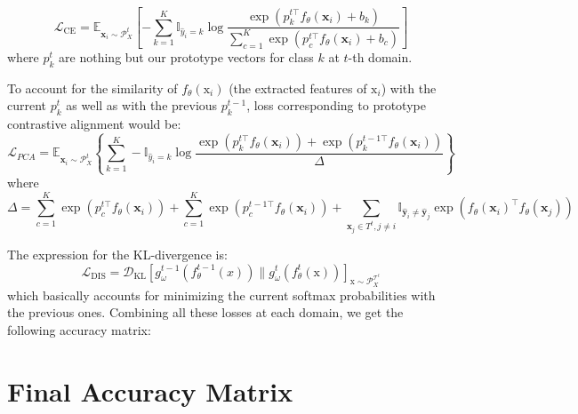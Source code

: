 \documentclass{article} %
\begin{document}
$$\mathcal{L}_{\text{CE}} = \mathbb{E}_{\textbf{x}_i \sim \mathcal{P}_X^t} \left[ - \sum_{k=1}^K \mathbb{I}_{\hat{y}_i = k} \log \frac{\exp \left( p_k^{t \top} f_\theta(\textbf{x}_i) + b_k \right)}{\sum_{c=1}^K \exp \left( p_c^{t \top} f_\theta(\textbf{x}_i) + b_c \right)} \right]$$
where $p_k^t$ are nothing but our prototype vectors for class $k$ at $t$-th domain. 

To account for the similarity of $f_\theta(\text{x}_i)$ (the extracted features of $\text{x}_i$) with the current $p_k^t$ as well as with the previous $p_k^{t - 1}$, loss corresponding to prototype contrastive alignment would be: 
\[\mathcal{L}_{PCA} = \mathbb{E}_{\textbf{x}_i \sim \mathcal{P}_X^t} \left\{\sum_{k=1}^K -\mathbb{I}_{\hat{y}_i = k} \log \frac{\exp \left( p_k^{t \top} f_\theta(\textbf{x}_i) \right) + \exp \left( p_k^{t-1 \top} f_\theta(\textbf{x}_i) \right)}{\Delta}\right \}
\]
where 
$$ \Delta = \sum_{c=1}^K \exp \left( p_c^{t \top} f_\theta(\textbf{x}_i) \right) + \sum_{c=1}^K \exp \left( p_c^{t-1 \top} f_\theta(\textbf{x}_i) \right) +\sum_{\textbf{x}_j \in T^t, j \neq i} \mathbb{I}_{\hat{\textbf{y}}_i \neq \hat{\textbf{y}}_j} \exp \left( f_\theta(\textbf{x}_i)^{\top} f_\theta(\textbf{x}_j) \right) $$

The expression for the KL-divergence is: 
$$\mathcal{L}_{\text{DIS}} = \mathcal{D}_{\text{KL}} [g_\omega^{t-1} (f_\theta^{t-1} (x)) \| g_\omega^t (f_\theta^t(\text{x}))]_{\text{x} \sim \mathcal{P}_X^{\mathcal{T}^t}}$$
which basically accounts for minimizing the current softmax probabilities with the previous ones. Combining all these losses at each domain, we get the following accuracy matrix: 
\section*{Final Accuracy Matrix}
\end{document}
